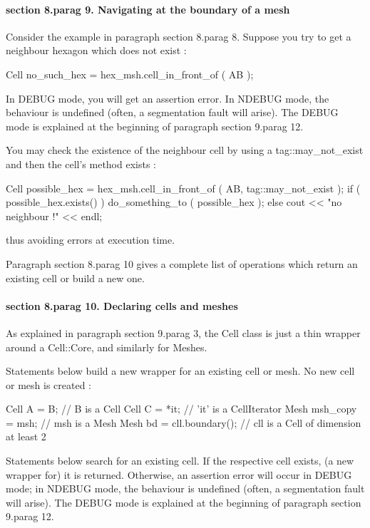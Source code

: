 {\paragraph{\numb section 8.\numb parag 9. Navigating at the boundary of a mesh}

Consider the example in paragraph \numb section 8.\numb parag 8.
Suppose you try to get a neighbour hexagon which does not exist :

\verbatim
   Cell no_such_hex = hex_msh.cell_in_front_of ( AB );
\endverbatim

In {\codett DEBUG} mode, you will get an {\codett assertion error}.
In {\codett NDEBUG} mode, the behaviour is undefined
(often, a {\codett segmentation fault} will arise).
The {\codett DEBUG} mode is explained at the beginning of paragraph \numb section
9.\numb parag 12.

You may check the existence of the neighbour cell by using a
{\codett tag::may\_not\_exist} and then the cell's method {\codett exists} :

\verbatim
   Cell possible_hex = hex_msh.cell_in_front_of ( AB, tag::may_not_exist );
   if ( possible_hex.exists() ) do_something_to ( possible_hex );
   else cout << "no neighbour !" << endl;
\endverbatim

\noindent thus avoiding errors at execution time.

Paragraph \numb section 8.\numb parag 10 gives a complete list of operations which return
an existing cell or build a new one.


\paragraph{\numb section 8.\numb parag 10. Declaring cells and meshes}

As explained in paragraph \numb section 9.\numb parag 3, the {\codett Cell} class
is just a thin wrapper around a {\codett Cell::Core}, and similarly for {\codett Mesh}es.

Statements below build a new wrapper for an existing cell or mesh.
No new cell or mesh is created :

\verbatim
   Cell A = B;  // B is a Cell
   Cell C = *it;  // 'it' is a CellIterator
   Mesh msh_copy = msh;  // msh is a Mesh
   Mesh bd = cll.boundary();  // cll is a Cell of dimension at least 2
\endverbatim

Statements below search for an existing cell.
If the respective cell exists, (a new wrapper for) it is returned.
Otherwise, an {\codett assertion error} will occur in {\codett DEBUG} mode;
in {\codett NDEBUG} mode, the behaviour is undefined (often, a {\codett segmentation fault}
will arise).
The {\codett DEBUG} mode is explained at the beginning of paragraph \numb section
9.\numb parag 12.

}
